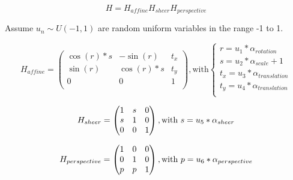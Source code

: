 \[
H = H_{affine} H_{sheer} H_{perspective}
\]

Assume $u_n \sim U(-1,1)$ are random uniform variables in the range -1 to 1.

\[
H_{affine} = 
\begin{pmatrix}
\cos(r)*s & -\sin(r) & t_x \\
\sin(r)& \cos(r)*s & t_y \\
0 & 0 & 1 \\
\end{pmatrix}
, \text{with}
\begin{cases}
r=u_1*\alpha_{rotation} \\
s=u_2*\alpha_{scale}+1 \\
t_x=u_3*\alpha_{translation} \\
t_y=u_4*\alpha_{translation} \\
\end{cases}
\]

\[
H_{sheer} = 
\begin{pmatrix}
1 & s & 0 \\
s & 1 & 0 \\
0 & 0 & 1 \\
\end{pmatrix}
, \text{with}
\ s=u_5*\alpha_{sheer} \\
\]

\[
H_{perspective} = 
\begin{pmatrix}
1 & 0 & 0 \\
0 & 1 & 0 \\
p & p & 1 \\
\end{pmatrix}
, \text{with}
\ p=u_6*\alpha_{perspective} \\
\]